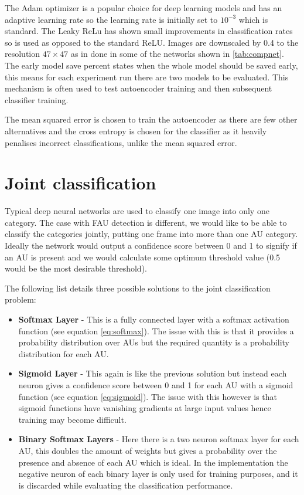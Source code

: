     The Adam optimizer is a popular choice for deep learning models and has an adaptive learning rate
    so the learning rate is initially set to $10^{-3}$ which is standard. The Leaky ReLu
    has shown small improvements in classification rates so is used as opposed
    to the standard ReLU. Images are downscaled by 0.4 to the resolution $47\times47$
    as in done in some of the networks shown in \ref{tab:compnet}.
    The early model save percent states when the whole model should be saved early,
    this means for each experiment run there are two models to be evaluated. This
    mechanism is often used to test autoencoder training and then subsequent classifier training.

    The mean squared error is chosen to train the autoencoder as there are few other alternatives
    and the cross entropy is chosen for the classifier as it heavily penalises incorrect classifications,
    unlike the mean squared error.

  \section{Joint classification} \label{sec:joints}

    Typical deep neural networks are used to classify
    one image into only one category. The case with FAU detection is different, we
    would like to be able to classify the categories jointly,  putting one frame into more than
    one AU category. Ideally the network would output a confidence score between 0 and 1
    to signify if an AU is present and we would calculate some optimum threshold value
    (0.5 would be the most desirable threshold).

    The following list details three possible solutions to the joint classification problem:

    \begin{itemize} \label{sec:binsoft}
      \item {\bf Softmax Layer} - This is a fully connected layer with
      a softmax activation function (see equation \ref{eq:softmax}).
      The issue with this is that it provides a probability distribution over AUs
      but the required quantity is a probability distribution for each AU.
      \item {\bf Sigmoid Layer} - This again is like the previous solution but instead each neuron gives a confidence
      score between 0 and 1 for each AU with a sigmoid function (see equation \ref{eq:sigmoid}).
      The issue with this however is that sigmoid
      functions have vanishing gradients at large input values
      hence training may become difficult.
      \item {\bf Binary Softmax Layers} - Here there is a two neuron softmax layer
      for each AU, this doubles the amount of weights
      but gives a probability over the presence and
      absence of each AU which is ideal. In the implementation
      the negative neuron of each binary layer is only used for training purposes, and it is
      discarded while evaluating the classification performance.
    \end{itemize}


